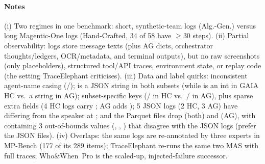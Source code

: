 \paragraph{Notes} (i) Two regimes in one benchmark: short, synthetic-team logs (Alg.-Gen.) versus long Magentic-One logs (Hand-Crafted, 34 of 58 have $\ge$30 steps). (ii) Partial observability: logs store message texts (plus AG  dicts, orchestrator thoughts/ledgers, OCR/metadata, and terminal outputs), but no raw screenshots (only  placeholders), structured tool/API traces, environment state, or replay code (the setting TraceElephant criticises). (iii) Data and label quirks: inconsistent agent-name casing (/);  is a JSON string in both subsets (while  is an int in GAIA HC vs.\ a string in AG); subset-specific keys (/ in HC vs.\ / in AG), plus sparse extra fields (4 HC logs carry ; AG  adds ); 5 JSON logs (2 HC, 3 AG) have  differing from the speaker at ; and the Parquet files drop  (both) and  (AG), with  containing 3 out-of-bounds  values (, , ) that disagree with the JSON logs (prefer the JSON files). (iv) Overlaps: the same logs are re-annotated by three experts in MP-Bench (177 of its 289 items); TraceElephant re-runs the same two MAS with full traces; Who\&When~Pro is the scaled-up, injected-failure successor.
